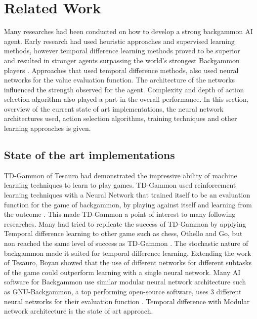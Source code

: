 \documentclass[12pt,a4paper]{article}
\begin{document}
\section{Related Work}
Many researches had been conducted on how to develop a strong backgammon AI agent. Early research had used heuristic approaches and supervised learning methods, however temporal difference learning methods proved to be superior and resulted in stronger agents surpassing the world's strongest Backgammon players \cite{DBLP:journals/ai/Tesauro02}. Approaches that used temporal difference methods, also used neural networks for the  value evaluation function. The architecture of the networks influenced the strength observed for the agent. Complexity and depth of action selection algorithm also played a part in the overall performance. In this section, overview of the current state of art implementations, the neural network architectures used, action selection algorithms, training techniques and other learning approaches is given. 

\subsection{State of the art implementations}
TD-Gammon of Tesauro \citeyear{DBLP:conf/icml/Tesauro92,DBLP:journals/ai/Tesauro02} had demonstrated the impressive ability of machine learning techniques to learn to play games.  TD-Gammon used reinforcement learning techniques with a Neural Network that trained itself to be an evaluation function for the game of backgammon, by playing against itself and learning from the outcome \cite{DBLP:journals/ai/Tesauro02}. This made TD-Gammon a point of interest to many following researches. Many had tried to replicate the success of TD-Gammon by applying Temporal difference learning to other game such as chess, Othello and Go, but non reached the same level of success as TD-Gammon \cite{survey}. The stochastic nature of backgammon made it suited for temporal difference learning. Extending the work of Tesauro, Boyan \citeyear{boyan} showed that the use of different networks for different subtasks of the game could outperform learning with a single neural network. Many AI software for Backgammon use similar modular neural network architecture such as GNU-Backgammon, a top performing open-source software, uses 3 different neural networks for their evaluation function \cite{gnubg}. Temporal difference with Modular network architecture is the state of art approach.
\end{document}

